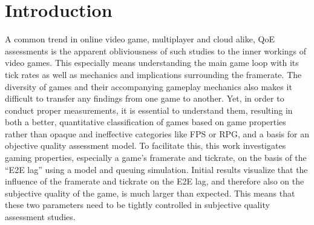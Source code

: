 \section{Introduction}
\label{sec:introduction}

A common trend in online video game, multiplayer and cloud alike, \gls{QoE} assessments is the apparent obliviousness of such studies to the inner workings of video games. This especially means understanding the main game loop with its tick rates as well as mechanics and implications surrounding the framerate. The diversity of games and their accompanying gameplay mechanics also makes it difficult to transfer any findings from one game to another. Yet, in order to conduct proper measurements, it is essential to understand them, resulting in both a better, quantitative classification of games based on game properties rather than opaque and ineffective categories like \gls{FPS} or \gls{RPG}, and a basis for an objective quality assessment model. To facilitate this, this work investigates gaming properties, especially a game's framerate and tickrate, on the basis of the ``\gls{E2E} lag'' using a model and queuing simulation. Initial results visualize that the influence of the framerate and tickrate on the \gls{E2E} lag, and therefore also on the subjective quality of the game, is much larger than expected. This means that these two parameters need to be tightly controlled in subjective quality assessment studies.


